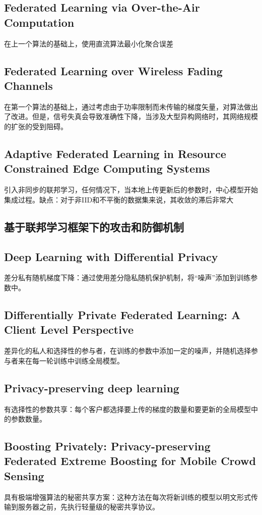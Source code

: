 \documentclass[12pt, a4paper]{article}
\begin{document}
        \subsection*{Federated Learning via Over-the-Air Computation\cite{8952884}}
            在上一个算法的基础上，使用直流算法最小化聚合误差
        \subsection*{Federated Learning over Wireless Fading Channels\cite{amiri2020federated}}
            在第一个算法的基础上，通过考虑由于功率限制而未传输的梯度矢量，对算法做出了改进。但是，信号失真会导致准确性下降，当涉及大型异构网络时，其网络规模的扩张的受到阻碍。
        \subsection*{Adaptive Federated Learning in Resource Constrained Edge Computing Systems\cite{wang2019adaptive}}
            引入非同步的联邦学习，任何情况下，当本地上传更新后的参数时，中心模型开始集成过程。缺点：对于非IID和不平衡的数据集来说，其收敛的滞后非常大
            
    \subsection*{基于联邦学习框架下的攻击和防御机制}
        \subsection*{Deep Learning with Differential Privacy\cite{Abadi_2016}}
            差分私有随机梯度下降：通过使用差分隐私随机保护机制，将“噪声”添加到训练参数中。
        \subsection*{Differentially Private Federated Learning: A Client Level Perspective\cite{geyer2018differentially}}
            差异化的私人和选择性的参与者，在训练的参数中添加一定的噪声，并随机选择参与者来在每一轮训练中训练全局模型。
        \subsection*{Privacy-preserving deep learning\cite{7447103}}
            有选择性的参数共享：每个客户都选择要上传的梯度的数量和要更新的全局模型中的参数数量。
        \subsection*{Boosting Privately: Privacy-preserving Federated Extreme Boosting for Mobile Crowd Sensing}
            具有极端增强算法的秘密共享方案：这种方法在每次将新训练的模型以明文形式传输到服务器之前，先执行轻量级的秘密共享协议。
\end{document}
